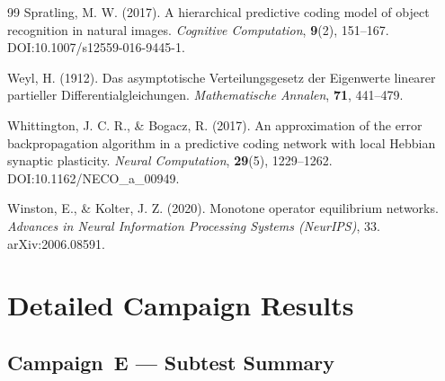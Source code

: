 \documentclass[11pt,a4paper]{article}
\begin{document}
\begin{thebibliography}{99}
Spratling, M. W. (2017).
A hierarchical predictive coding model of object recognition in natural images.
\textit{Cognitive Computation}, \textbf{9}(2), 151--167.
DOI:10.1007/s12559-016-9445-1.

Weyl, H. (1912).
Das asymptotische Verteilungsgesetz der Eigenwerte linearer partieller
Differentialgleichungen.
\textit{Mathematische Annalen}, \textbf{71}, 441--479.

Whittington, J. C. R., \& Bogacz, R. (2017).
An approximation of the error backpropagation algorithm in a predictive coding network
with local Hebbian synaptic plasticity.
\textit{Neural Computation}, \textbf{29}(5), 1229--1262.
DOI:10.1162/NECO\_a\_00949.

Winston, E., \& Kolter, J. Z. (2020).
Monotone operator equilibrium networks.
\textit{Advances in Neural Information Processing Systems (NeurIPS)}, 33.
arXiv:2006.08591.

\end{thebibliography}

\appendix

\section{Detailed Campaign Results}

\subsection{Campaign~E --- Subtest Summary}
\end{document}
